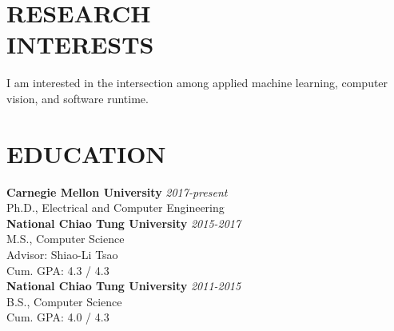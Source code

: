 \documentclass[margin, 9pt]{res} %
\begin{document}
\begin{resume}


\vspace*{-5pt}
\section{RESEARCH\\ INTERESTS}

I am interested in the intersection among applied machine learning, computer
vision, and software runtime.



\section{EDUCATION}

\textbf{Carnegie Mellon University} \hfill\textit{2017-present}\\
Ph.D., Electrical and Computer Engineering\\

\textbf{National Chiao Tung University} \hfill\textit{2015-2017}\\
M.S., Computer Science\\
Advisor: Shiao-Li Tsao\\
Cum. GPA: 4.3 / 4.3\\

\vspace*{-5pt}
\textbf{National Chiao Tung University} \hfill\textit{2011-2015}\\
B.S., Computer Science\\
Cum. GPA: 4.0 / 4.3\\



\end{resume}
\end{document}
